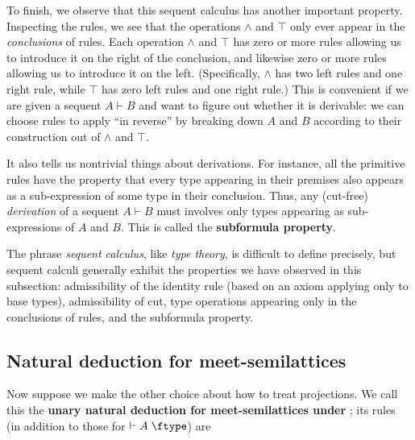 \documentclass{book}
\def\idfunc{\mathsf{id}}
\let\types\vdash
\def\type{\;\ftype}
\let\meet\wedge
\def\meetE{\mathord{\meet}E}
\def\meetI{\mathord{\meet}I}
\begin{document}
To finish, we observe that this sequent calculus has another important property.
Inspecting the rules, we see that the operations $\meet$ and $\top$ only ever appear in the \emph{conclusions} of rules.
Each operation $\meet$ and $\top$ has zero or more rules allowing us to introduce it on the right of the conclusion, and likewise zero or more rules allowing us to introduce it on the left.
(Specifically, $\meet$ has two left rules and one right rule, while $\top$ has zero left rules and one right rule.)
This is convenient if we are given a sequent $A\types B$ and want to figure out whether it is derivable: we can choose rules to apply ``in reverse'' by breaking down $A$ and $B$ according to their construction out of $\meet$ and $\top$.

It also tells us nontrivial things about derivations.
For instance, all the primitive rules have the property that every type appearing in their premises also appears as a sub-expression of some type in their conclusion.
Thus, any (cut-free) \emph{derivation} of a sequent $A\types B$ must involves only types appearing as sub-expressions of $A$ and $B$.
This is called the \textbf{subformula property}.

The phrase \emph{sequent calculus}, like \emph{type theory}, is difficult to define precisely, but sequent calculi generally exhibit the properties we have observed in this subsection: admissibility of the identity rule (based on an axiom applying only to base types), admissibility of cut, type operations appearing only in the conclusions of rules, and the subformula property.

\subsection{Natural deduction for meet-semilattices}
\label{sec:natded-mslat}

Now suppose we make the other choice about how to treat projections.
We call this the \textbf{unary natural deduction for meet-semilattices under \cG}; its rules (in addition to those for $\types A\type$) are
\end{document}
